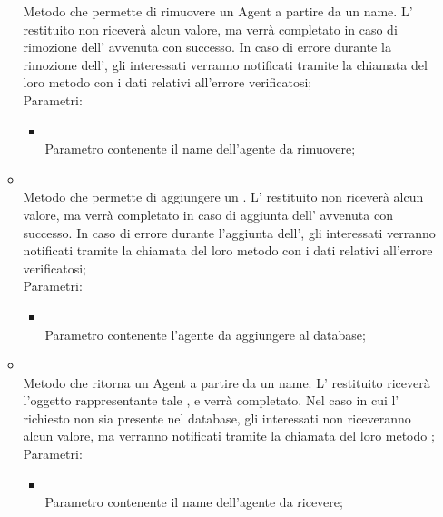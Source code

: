 \begin{itemize}
\begin{itemize}
		Metodo che permette di rimuovere un Agent a partire da un name.  L' restituito non riceverà alcun valore, ma verrà completato in caso di rimozione dell' avvenuta con successo. In caso di errore durante la rimozione dell', gli  interessati verranno notificati tramite la chiamata del loro metodo  con i dati relativi all'errore verificatosi;\\
		Parametri:
		\begin{itemize}
			\item {} \\
			Parametro contenente il name dell'agente da rimuovere;
		\end{itemize}
		\item[]  \\
		Metodo che permette di aggiungere un .  L' restituito non riceverà alcun valore, ma verrà completato in caso di aggiunta dell' avvenuta con successo. In caso di errore durante l'aggiunta dell', gli  interessati verranno notificati tramite la chiamata del loro metodo  con i dati relativi all'errore verificatosi;\\
		Parametri:
		\begin{itemize}
			\item {} \\
			Parametro contenente l'agente da aggiungere al database;
		\end{itemize}
		\item[]  \\
		Metodo che ritorna un Agent a partire da un name. L' restituito riceverà l'oggetto rappresentante tale , e verrà completato. Nel caso in cui l' richiesto non sia presente nel database, gli  interessati non riceveranno alcun valore, ma verranno notificati tramite la chiamata del loro metodo ;\\
		Parametri:
		\begin{itemize}
			\item {} \\
			Parametro contenente il name dell'agente da ricevere;
		\end{itemize}
	\end{itemize}
\end{itemize}

